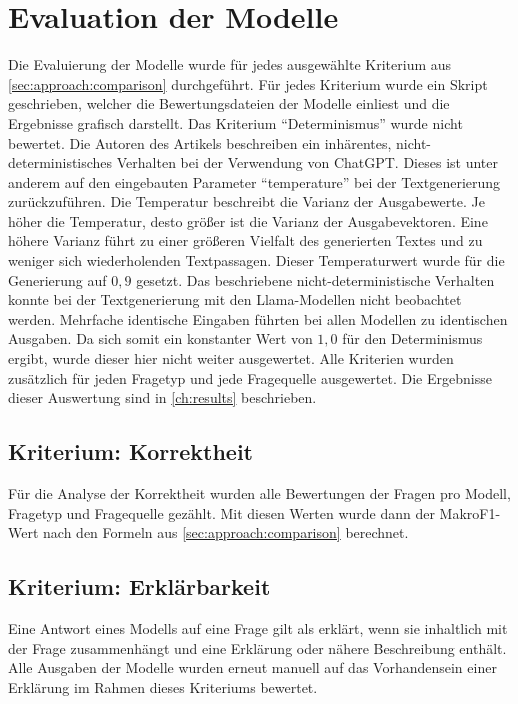 \section{Evaluation der Modelle}\label{sec:evaluation}
Die Evaluierung der Modelle wurde für jedes ausgewählte Kriterium aus \cref{sec:approach:comparison} durchgeführt.
Für jedes Kriterium wurde ein Skript geschrieben, welcher die Bewertungsdateien der Modelle einliest und die Ergebnisse grafisch darstellt.
Das Kriterium \enquote{Determinismus} wurde nicht bewertet.
Die Autoren des Artikels \citet{chatgpt_qas} beschreiben ein inhärentes, nicht-deterministisches Verhalten bei der Verwendung von ChatGPT.
Dieses ist unter anderem auf den eingebauten Parameter \enquote{temperature} bei der Textgenerierung zurückzuführen.
Die Temperatur beschreibt die Varianz der Ausgabewerte.
Je höher die Temperatur, desto größer ist die Varianz der Ausgabevektoren.
Eine höhere Varianz führt zu einer größeren Vielfalt des generierten Textes und zu weniger sich wiederholenden Textpassagen.
Dieser Temperaturwert wurde für die Generierung auf $0,9$ gesetzt.
Das beschriebene nicht-deterministische Verhalten konnte bei der Textgenerierung mit den Llama-Modellen nicht beobachtet werden.
Mehrfache identische Eingaben führten bei allen Modellen zu identischen Ausgaben.
Da sich somit ein konstanter Wert von $1,0$ für den Determinismus ergibt, wurde dieser hier nicht weiter ausgewertet.
Alle Kriterien wurden zusätzlich für jeden Fragetyp und jede Fragequelle ausgewertet.
Die Ergebnisse dieser Auswertung sind in \cref{ch:results} beschrieben.\\

\subsection{Kriterium: Korrektheit}
Für die Analyse der Korrektheit wurden alle Bewertungen der Fragen pro Modell, Fragetyp und Fragequelle gezählt.
Mit diesen Werten wurde dann der MakroF1-Wert nach den Formeln aus \cref{sec:approach:comparison} berechnet.

\subsection{Kriterium: Erklärbarkeit}
Eine Antwort eines Modells auf eine Frage gilt als erklärt, wenn sie inhaltlich mit der Frage zusammenhängt und eine Erklärung oder nähere Beschreibung enthält.
Alle Ausgaben der Modelle wurden erneut manuell auf das Vorhandensein einer Erklärung im Rahmen dieses Kriteriums bewertet.

